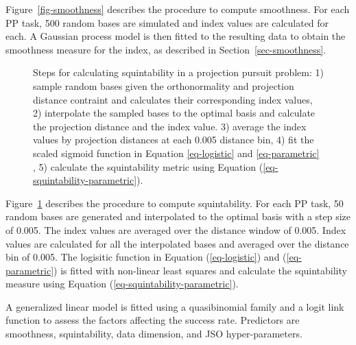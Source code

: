 \documentclass[
  12pt,
]{interact}
\theoremstyle{plain}
\begin{document}
Figure~\ref{fig-smoothness} describes the procedure to compute
smoothness. For each PP task, 500 random bases are simulated and index
values are calculated for each. A Gaussian process model is then fitted
to the resulting data to obtain the smoothness measure for the index, as
described in Section~\ref{sec-smoothness}.

\begin{figure}


\caption{\label{fig-squintability}Steps for calculating squintability in
a projection pursuit problem: 1) sample random bases given the
orthonormality and projection distance contraint and calculates their
corresponding index values, 2) interpolate the sampled bases to the
optimal basis and calculate the projection distance and the index value.
3) average the index values by projection distances at each 0.005
distance bin, 4) fit the scaled sigmoid function in Equation
\eqref{eq-logistic} and \eqref{eq-parametric} , 5) calculate the
squintability metric using Equation
(\ref{eq-squintability-parametric}).}

\end{figure}%

Figure~\ref{fig-squintability} describes the procedure to compute
squintability. For each PP task, 50 random bases are generated and
interpolated to the optimal basis with a step size of 0.005. The index
values are averaged over the distance window of 0.005. Index values are
calculated for all the interpolated bases and averaged over the distance
bin of 0.005. The logisitic function in Equation (\ref{eq-logistic}) and
(\ref{eq-parametric}) is fitted with non-linear least squares and
calculate the squintability measure using Equation
(\ref{eq-squintability-parametric}).

A generalized linear model is fitted using a quasibinomial family and a
logit link function to assess the factors affecting the success rate.
Predictors are smoothness, squintability, data dimension, and JSO
hyper-parameters.
\end{document}
